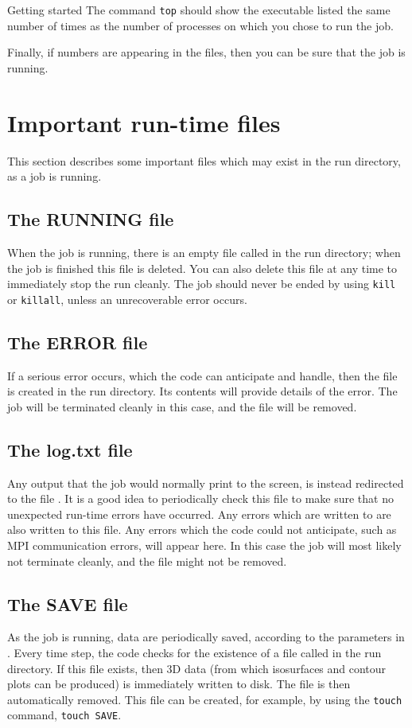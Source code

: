 \begin{chapter}{\label{cha:quickstart}Getting started}
  The command \verb"top" should show the  executable listed the
  same number of times as the number of processes on which you chose to run the
  job.

  Finally, if numbers are appearing in the  files, then you can
  be sure that the job is running.

  \section{Important run-time files}
  This section describes some important files which may exist in the run
  directory, as a job is running.

  \subsection{The RUNNING file}
  When the job is running, there is an empty file called  in
  the run directory; when the job is finished this file is deleted.  You can
  also delete this file at any time to immediately stop the run cleanly.  The
  job should never be ended by using \verb"kill" or \verb"killall", unless an
  unrecoverable error occurs.

  \subsection{The ERROR file}
  If a serious error occurs, which the code can anticipate and handle, then the
   file is created in the run directory.  Its contents will
  provide details of the error.  The job will be terminated cleanly in this
  case, and the  file will be removed.

  \subsection{The log.txt file}
  Any output that the job would normally print to the screen, is instead
  redirected to the file .  It is a good idea to periodically
  check this file to make sure that no unexpected run-time errors have
  occurred.  Any errors which are written to  are also written
  to this file.  Any errors which the code could not anticipate, such as MPI
  communication errors, will appear here.  In this case the job will most
  likely not terminate cleanly, and the  file might not be
  removed.

  \subsection{The SAVE file}
  As the job is running, data are periodically saved, according to the
   parameters in .  Every time step, the
  code checks for the existence of a file called  in the run
  directory.  If this file exists, then 3D data (from which isosurfaces and
  contour plots can be produced) is immediately written to disk.  The
   file is then automatically removed.  This file can be created,
  for example, by using the \verb"touch" command, \ie \verb"touch SAVE".


\end{chapter}
